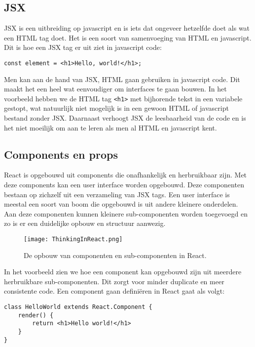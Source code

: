 \subsection{JSX}
\label{subsec:jsx}
JSX is een uitbreiding op javascript en is iets dat ongeveer hetzelfde doet als wat een HTML tag doet. Het is een soort van samenvoeging van HTML en javascript. Dit is hoe een JSX tag er uit ziet in javascript code: 

\begin{lstlisting}[frame=single, caption=Voorbeeld van een JSX tag]
const element = <h1>Hello, world!</h1>;
\end{lstlisting}

Men kan aan de hand van JSX, HTML gaan gebruiken in javascript code. Dit maakt het een heel wat eenvoudiger om interfaces te gaan bouwen. In het voorbeeld hebben we de HTML tag \lstinline[basicstyle=\ttfamily\color{red}]|<h1>| met bijhorende tekst in een variabele gestopt, wat natuurlijk niet mogelijk is in een gewoon HTML of javascript bestand zonder JSX. Daarnaast verhoogt JSX de leesbaarheid van de code en is het niet moeilijk om aan te leren als men al HTML en javascript kent.

\subsection{Components en props}
\label{subsec:components-en-props}
React is opgebouwd uit components die onafhankelijk en herbruikbaar zijn. Met deze components kan een user interface worden opgebouwd. Deze componenten bestaan op zichzelf uit een verzameling van JSX tags. Een user interface is meestal een soort van boom die opgebouwd is uit andere kleinere onderdelen. Aan deze componenten kunnen kleinere sub-componenten worden toegevoegd en zo is er een duidelijke opbouw en structuur aanwezig.

\begin{figure}
	\centering
	\texttt{[image: ThinkingInReact.png]}
	\caption{De opbouw van componenten en sub-componenten in React.}
	\label{fig:ar-vs-vr}
\end{figure}

In het voorbeeld zien we hoe een component kan opgebouwd zijn uit meerdere herbruikbare sub-componenten. Dit zorgt voor minder duplicate en meer consistente code. Een component gaan definiëren in React gaat als volgt:

\begin{lstlisting}[frame=single, caption=Het component HelloWorld wordt gedefinieerd]
class HelloWorld extends React.Component {
	render() {
		return <h1>Hello world!</h1>
	}
}
\end{lstlisting}

